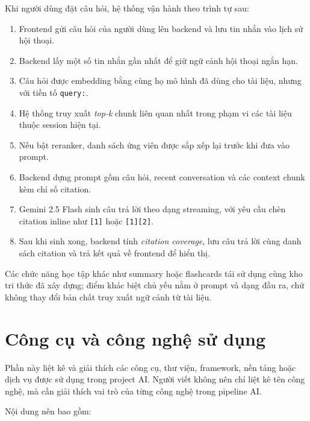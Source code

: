 \documentclass[12pt]{ai_conquer2026}
\begin{document}
Khi người dùng đặt câu hỏi, hệ thống vận hành theo trình tự sau:

\begin{enumerate}
    \item Frontend gửi câu hỏi của người dùng lên backend và lưu tin nhắn vào lịch sử hội thoại.
    \item Backend lấy một số tin nhắn gần nhất để giữ ngữ cảnh hội thoại ngắn hạn.
    \item Câu hỏi được embedding bằng cùng họ mô hình đã dùng cho tài liệu, nhưng với tiền tố \texttt{query:}.
    \item Hệ thống truy xuất \textit{top-k} chunk liên quan nhất trong phạm vi các tài liệu thuộc session hiện tại.
    \item Nếu bật reranker, danh sách ứng viên được sắp xếp lại trước khi đưa vào prompt.
    \item Backend dựng prompt gồm câu hỏi, recent conversation và các context chunk kèm chỉ số citation.
    \item Gemini 2.5 Flash sinh câu trả lời theo dạng streaming, với yêu cầu chèn citation inline như \texttt{[1]} hoặc \texttt{[1][2]}.
    \item Sau khi sinh xong, backend tính \textit{citation coverage}, lưu câu trả lời cùng danh sách citation và trả kết quả về frontend để hiển thị.
\end{enumerate}

Các chức năng học tập khác như summary hoặc flashcards tái sử dụng cùng kho tri thức đã xây dựng; điểm khác biệt chủ yếu nằm ở prompt và dạng đầu ra, chứ không thay đổi bản chất truy xuất ngữ cảnh từ tài liệu.

\section{Công cụ và công nghệ sử dụng}

Phần này liệt kê và giải thích các công cụ, thư viện, framework, nền tảng hoặc dịch vụ được sử dụng trong project AI. Người viết không nên chỉ liệt kê tên công nghệ, mà cần giải thích vai trò của từng công nghệ trong pipeline AI.

Nội dung nên bao gồm:
\end{document}
